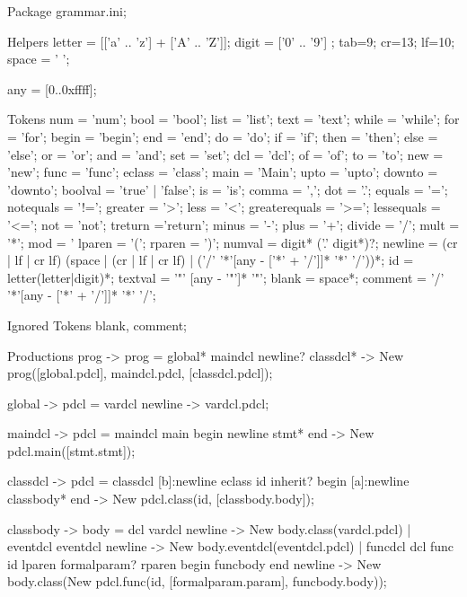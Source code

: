Package grammar.ini; \label{FullGrammar}

Helpers
    letter = [['a' .. 'z'] + ['A' .. 'Z']];
    digit = ['0' .. '9'] ;
    tab=9; cr=13; lf=10; space = ' ';

    any = [0..0xffff];



Tokens
    num = 'num';
    bool = 'bool';
    list = 'list';
    text = 'text';
    while = 'while';
    for = 'for';
    begin = 'begin';
    end = 'end';
    do = 'do';
    if = 'if';
    then = 'then';
    else = 'else';
    or = 'or';
    and = 'and';
    set = 'set';
    dcl = 'dcl';
    of = 'of';
    to = 'to';
    new = 'new';
    func = 'func';
    eclass = 'class';
    main = 'Main';
    upto = 'upto';
    downto = 'downto';
    boolval = 'true' | 'false';
    is = 'is';
    comma = ',';
    dot = '.';
    equals = '=';
    notequals = '!=';
    greater = '>';
    less = '<';
    greaterequals = '>=';
    lessequals = '<=';
    not = 'not';
    treturn ='return';
    minus = '-';
    plus = '+';
    divide = '/';
    mult = '*';
    mod = '%
    lparen = '(';
    rparen = ')';
    numval = digit* ('.' digit*)?;
    newline = (cr | lf | cr lf) (space | (cr | lf | cr lf) | ('/' '*'[any - ['*' + '/']]* '*' '/'))*;
    id = letter(letter|digit)*;
    textval = '"' [any - '"']* '"';
    blank = space*;
    comment = '/' '*'[any - ['*' + '/']]* '*' '/';

Ignored Tokens
     blank,
     comment;

Productions
    prog        {-> prog}   =   global* maindcl newline? classdcl*                      {-> New prog([global.pdcl], maindcl.pdcl, [classdcl.pdcl])};

    global      {-> pdcl}   =   vardcl newline                                          {-> vardcl.pdcl};

    maindcl     {-> pdcl}   =   {maindcl} main begin newline stmt* end           {-> New pdcl.main([stmt.stmt])};

    classdcl    {-> pdcl}   =   {classdcl} [b]:newline eclass id inherit? begin [a]:newline classbody* end    {-> New pdcl.class(id, [classbody.body])};

    classbody   {-> body}   =   {dcl} vardcl newline                                                            {-> New body.class(vardcl.pdcl)}
                            |   {eventdcl} eventdcl newline                                                     {-> New body.eventdcl(eventdcl.pdcl)}
                            |   {funcdcl} dcl func id lparen formalparam? rparen begin funcbody end newline     {-> New body.class(New pdcl.func(id, [formalparam.param], funcbody.body))};

